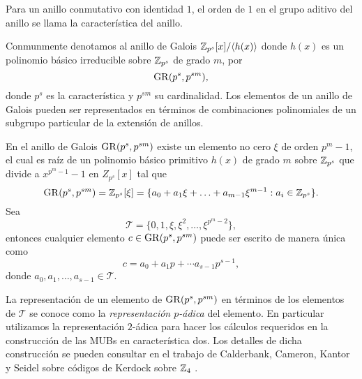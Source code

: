 \begin{definition}
  Para un anillo conmutativo con identidad $1$, el orden de
  $1$ en el grupo aditivo del anillo se llama la
  característica del anillo.
\end{definition}
Conmunmente denotamos al anillo de Galois $\operatorname{\mathbb{Z}}_{p^{s}}[x] /
\langle h(x) \rangle$ donde $h(x)$ es un polinomio básico
irreducible sobre $\operatorname{\mathbb{Z}}_{p^{s}}$ de grado $m$, por
\[
  \operatorname{GR}(p^{s}, p^{sm}),
\] 
donde $p^{s}$ es la característica y $p^{sm}$ su
cardinalidad. Los elementos de un anillo de Galois pueden
ser representados en términos de combinaciones polinomiales
de un subgrupo particular de la extensión de anillos.
\begin{theorem}
  En el anillo de Galois $\operatorname{GR}(p^{s}, p^{sm})$ existe un
  elemento no cero $\xi$ de orden $p^{m}-1$, el cual es raíz
  de un polinomio básico primitivo $h(x)$ de grado $m$ sobre
  $\operatorname{\mathbb{Z}}_{p^{s}}$ que divide a $x^{p^{m}-1} - 1$ en
  $Z_{p^{s}}[x]$ tal que
  \begin{equation}
    \operatorname{GR}(p^{s},p^{sm})
    = \operatorname{\mathbb{Z}}_{p^{s}}[\xi]
    = \{a_0+a_1\xi+\ldots+a_{m-1}\xi^{m-1} : a_i \in
    \operatorname{\mathbb{Z}}_{p^{s}}\}.
  \end{equation}
  Sea
  \begin{equation}
    \mathcal T
    = \{0,1,\xi,\xi^2,\ldots,\xi^{p^{m}-2}\},
  \end{equation}
  entonces cualquier elemento $c \in \operatorname{GR}(p^{s},p^{sm})$ 
  puede ser escrito de manera única como
  \[
    c = a_0 + a_1p + \cdots a_{s-1}p^{s-1},
  \] 
  donde $a_0,a_1,\ldots,a_{s-1} \in \mathcal T$.
\end{theorem}
La representación de un elemento de $\operatorname{GR}(p^{s},p^{sm})$ en
términos de los elementos de $\mathcal T$ se conoce como la
\textit{representación $p$-ádica} del elemento. En
particular utilizamos la representación $2$-ádica para hacer
los cálculos requeridos en la construcción de las MUBs en
característica dos. Los detalles de dicha construcción se
pueden consultar en el trabajo de Calderbank, Cameron,
Kantor y Seidel sobre códigos de Kerdock sobre $\operatorname{\mathbb{Z}}_4$
\cite{calderbank}.

